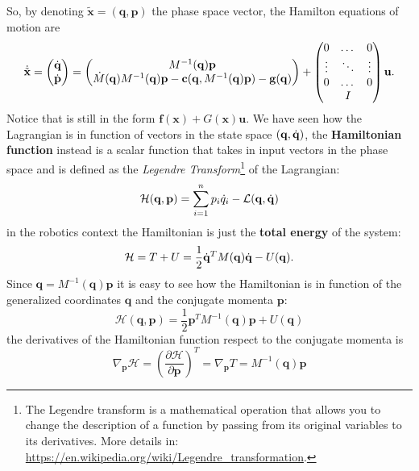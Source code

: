 \documentclass[10pt, a4paper]{report}
\newcommand{\q}{{\mathbf q}}
\begin{document}
So, by denoting $\tilde{\mathbf x}=(\q,\mathbf p)$ the phase space vector, the Hamilton equations of motion  are\begin{equation}
    \dot{\tilde{\mathbf x}}=\begin{pmatrix}
        \dq\\ 
        \dot{\mathbf p}
    \end{pmatrix}=\begin{pmatrix}
        M^{-1}(\q)\mathbf p\\
        \dot{M}(\q)M^{-1}(\q)\mathbf  p - \mathbf  c(\q, M^{-1}(\q)\mathbf p) -\mathbf  g(\mathbf q)
    \end{pmatrix}+\begin{pmatrix}
        \begin{matrix}
        0&\dots&0\\
        \vdots&\ddots&\vdots\\
        0&\dots&0
        \end{matrix}\\ I
    \end{pmatrix}\mathbf u.
\end{equation}
Notice that is still in the form  $\mathbf f(\mathbf x)+G(\mathbf x)\mathbf u$.
We have seen how the Lagrangian is in function of vectors in the state space $(\q,\dq)$, the \textbf{Hamiltonian function} instead is a scalar function that takes in input vectors in the phase space and is defined as the \textit{Legendre Transform}\footnote{
    The Legendre transform is a mathematical operation that allows you to change the description of a function by passing from its original variables to its derivatives. More details in: \url{https://en.wikipedia.org/wiki/Legendre_transformation}.
}
of the Lagrangian:\begin{equation}
    \mathcal H(\q,\mathbf p)=\sum_{i=1}^{n}p_i\dot q_i-\mathcal L(\q,\dq)
\end{equation}
in the robotics context the Hamiltonian is just the \textbf{total energy} of the system:\begin{equation}
    \mathcal{H}=T+U=\frac{1}{2}\dq^TM(\q)\dq-U(\q).
\end{equation}
Since $\q=M^{-1}(\q)\mathbf p$ it is easy to see how the Hamiltonian is in function of the generalized coordinates $\q$ and the conjugate momenta $\mathbf p$:\begin{equation}
    \mathcal H(\q,\mathbf p)=\frac{1}{2}\mathbf p^TM^{-1}(\q)\mathbf p+U(\q)
\end{equation}
the derivatives of the Hamiltonian function respect to the conjugate momenta is\begin{equation}
    \nabla_\mathbf p\mathcal H =\left(\frac{\partial \mathcal H}{\partial \mathbf p}\right)^T=\nabla_\mathbf p T =M^{-1}(\q)\mathbf p
\end{equation}
\end{document}
